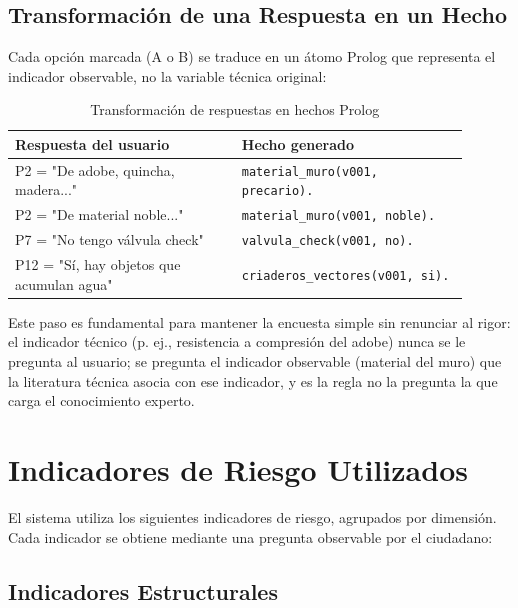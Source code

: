 \documentclass[12pt, letterpaper]{article}
\begin{document}
\subsection{Transformación de una Respuesta en un Hecho}

Cada opción marcada (A o B) se traduce en un átomo Prolog que representa el indicador observable, no la variable técnica original:

\begin{table}[H]
\centering
\caption{Transformación de respuestas en hechos Prolog}
\label{tab:transformacion}
\begin{tabular}{@{}p{0.45\linewidth}p{0.45\linewidth}@{}}
\toprule
\textbf{Respuesta del usuario} & \textbf{Hecho generado} \\ \midrule
P2 = "De adobe, quincha, madera..." & \texttt{material\_muro(v001, precario).} \\
P2 = "De material noble..." & \texttt{material\_muro(v001, noble).} \\
P7 = "No tengo válvula check" & \texttt{valvula\_check(v001, no).} \\
P12 = "Sí, hay objetos que acumulan agua" & \texttt{criaderos\_vectores(v001, si).} \\ \bottomrule
\end{tabular}
\end{table}

Este paso es fundamental para mantener la encuesta simple sin renunciar al rigor: el indicador técnico (p. ej., resistencia a compresión del adobe) nunca se le pregunta al usuario; se pregunta el indicador observable (material del muro) que la literatura técnica asocia con ese indicador, y es la regla no la pregunta la que carga el conocimiento experto.

\section{Indicadores de Riesgo Utilizados}

El sistema utiliza los siguientes indicadores de riesgo, agrupados por dimensión. Cada indicador se obtiene mediante una pregunta observable por el ciudadano:

\subsection{Indicadores Estructurales}
\end{document}
